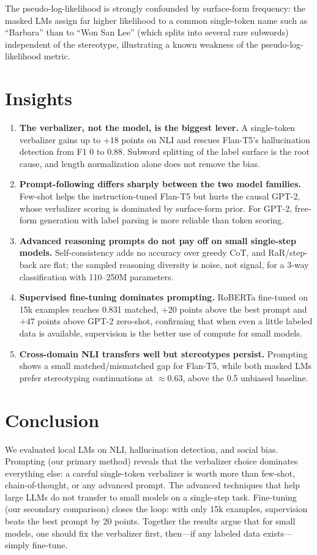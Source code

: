 \documentclass[11pt]{article}
\begin{document}
The pseudo-log-likelihood is strongly confounded by surface-form frequency: the masked LMs
assign far higher likelihood to a common single-token name such as ``Barbara'' than to
``Won San Lee'' (which splits into several rare subwords) independent of the stereotype,
illustrating a known weakness of the pseudo-log-likelihood metric.

\section{Insights}
\begin{enumerate}
  \item \textbf{The verbalizer, not the model, is the biggest lever.} A single-token verbalizer gains up to $+18$ points on NLI and rescues Flan-T5's hallucination detection from F1 0 to 0.88. Subword splitting of the label surface is the root cause, and length normalization alone does not remove the bias.
  \item \textbf{Prompt-following differs sharply between the two model families.} Few-shot helps the instruction-tuned Flan-T5 but hurts the causal GPT-2, whose verbalizer scoring is dominated by surface-form prior. For GPT-2, free-form generation with label parsing is more reliable than token scoring.
  \item \textbf{Advanced reasoning prompts do not pay off on small single-step models.} Self-consistency adds no accuracy over greedy CoT, and RaR/step-back are flat; the sampled reasoning diversity is noise, not signal, for a 3-way classification with 110--250M parameters.
  \item \textbf{Supervised fine-tuning dominates prompting.} RoBERTa fine-tuned on 15k examples reaches 0.831 matched, $+20$ points above the best prompt and $+47$ points above GPT-2 zero-shot, confirming that when even a little labeled data is available, supervision is the better use of compute for small models.
  \item \textbf{Cross-domain NLI transfers well but stereotypes persist.} Prompting shows a small matched/mismatched gap for Flan-T5, while both masked LMs prefer stereotyping continuations at $\approx$0.63, above the 0.5 unbiased baseline.
\end{enumerate}

\section{Conclusion}
We evaluated local LMs on NLI, hallucination detection, and social bias. Prompting (our primary method) reveals that the verbalizer choice dominates everything else: a careful single-token verbalizer is worth more than few-shot, chain-of-thought, or any advanced prompt. The advanced techniques that help large LLMs do not transfer to small models on a single-step task. Fine-tuning (our secondary comparison) closes the loop: with only 15k examples, supervision beats the best prompt by 20 points. Together the results argue that for small models, one should fix the verbalizer first, then---if any labeled data exists---simply fine-tune.
\end{document}
